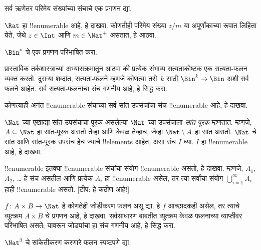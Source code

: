 \documentclass[../../../include/open-logic-section]{subfiles}
\begin{document}
\begin{prob}
सर्व ऋणेतर परिमेय संख्यांच्या संचाचे एक प्रगणन द्या.
\end{prob}

\begin{prob}
$\Rat$ हा !!{enumerable} आहे, हे दाखवा. कोणतीही परिमेय संख्या
$z/m$ या अपूर्णांकाच्या रूपात लिहिता येते, जेथे $z \in \Int$ आणि
$m \in \Nat^+$ असतात, हे आठवा.
\end{prob}

\begin{prob}
$\Bin^*$ चे एक प्रगणन परिभाषित करा.
\end{prob}

\begin{prob}
प्रास्ताविक तर्कशास्त्राच्या अभ्यासक्रमातून आठवा की प्रत्येक संभाव्य
सत्यताकोष्टक एक सत्यता-फलन व्यक्त करतो. दुसऱ्या शब्दांत, सत्यता-फलने
म्हणजे कोणत्या तरी~$k$ साठी $\Bin^k \to \Bin$ अशी सर्व फलने आहेत.
सर्व सत्यता-फलनांचा संच गणनीय आहे, हे सिद्ध करा.
\end{prob}

\begin{prob}
कोणत्याही अनंत !!{enumerable} संचाच्या सर्व सांत उपसंचांचा संच
!!{enumerable} आहे, हे दाखवा.
\end{prob}

\begin{prob}
$\Nat$ च्या एखाद्या सांत उपसंचाचा पूरक असलेल्या $\Nat$ च्या उपसंचाला
\emph{सांत-पूरक} म्हणतात. म्हणजे, $A \subseteq \Nat$ हा सांत-पूरक
असतो तेव्हा आणि केवळ तेव्हाच, जेव्हा $\Nat\setminus A$ हा सांत असतो.
$\Nat$ चे सांत आणि सांत-पूरक उपसंच हेच ज्याचे !!{element}s आहेत,
असा संच $I$ घ्या. $I$ हा !!{enumerable} आहे, हे दाखवा.
\end{prob}

\begin{prob}
!!{enumerable} इतक्या !!{enumerable} संचांचा संयोग !!{enumerable} असतो,
हे दाखवा. म्हणजे, $A_1$, $A_2$, \dots{} हे संच असतील आणि प्रत्येक
$A_i$ हा !!{enumerable} असेल, तर त्या सर्वांचा संयोग
$\bigcup_{i=1}^\infty A_i$ हाही !!{enumerable} असतो. [टीप: हे कठीण आहे!]
\end{prob}

\begin{prob}
$f \colon A \times B \to \Nat$ हे कोणतेही जोडीकरण फलन असू द्या.
हे $f$ आच्छादकही असेल, तर त्याचे व्युत्क्रम $A \times B$ चे प्रगणन
आहे, हे दाखवा. सर्वसाधारण बाबतीत व्युत्क्रम केवळ फलनाच्या व्याप्तीवर
परिभाषित असते; यावरून जोड्यांचा हा संच गणनीय आहे, हे सिद्ध करा.
\end{prob}

\begin{prob}
$\Nat^3$ चे सांकेतीकरण करणारे फलन स्पष्टपणे द्या.
\end{prob}
\end{document}
